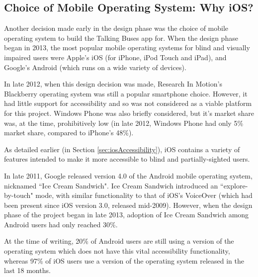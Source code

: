 \documentclass[10pt,twocolumn]{article}
\newcommand{\citep}[1]{}
\begin{document}
\subsection{Choice of Mobile Operating System: Why iOS?}
Another decision made early in the design phase was the choice of mobile operating system to build the Talking Buses app for. When the design phase began in 2013, the most popular mobile operating systems for blind and visually impaired users were Apple's iOS (for iPhone, iPod Touch and iPad), and Google's Android (which runs on a wide variety of devices).

In late 2012, when this design decision was made, Research In Motion's Blackberry operating system was still a popular smartphone choice. However, it had little support for accessibility and so was not considered as a viable platform for this project. Windows Phone was also briefly considered, but it's market share was, at the time, prohibitively low (in late 2012, Windows Phone had only 5\% market share, compared to iPhone's 48\%\citep{marketShare}). 

As detailed earlier (in Section \ref{sec:iosAccessibility}), iOS contains a variety of features intended to make it more accessible to blind and partially-sighted users.

In late 2011, Google released version 4.0 of the Android mobile operating system, nicknamed ``Ice Cream Sandwich". Ice Cream Sandwich introduced an ``explore-by-touch" mode\citep{iceCream}, with similar functionality to that of iOS's VoiceOver (which had been present since iOS version 3.0, released mid-2009\citep{ios3}). However, when the design phase of the project began in late 2013, adoption of Ice Cream Sandwich among Android users had only reached 30\%\citep{androidDistribution}.

At the time of writing, 20\% of Android users are still using a version of the operating system which does not have this vital accessibility functionality\citep{androidVersions}, whereas 97\% of iOS users use a version of the operating system released in the last 18 months\citep{appleDistribution}.

\iffalse
The accessibility features provided on iOS contribute to Apple's reputation for accessibility. As expressed by Stevie Wonder:
\blockquote{There's nothing on the iPhone or iPad that you can do that I can't do. As a matter of fact, I can be talking to you, you can be looking at me, and I can be doing whatever I need to do and you don't even know what I'm doing}\citep{wonder}.
\else\fi
\end{document}
